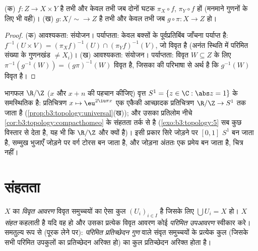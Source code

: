 \begin{proposition}[सार्वत्रिक गुण]
\label{prop:b3:topology:universal}
(क) $f \colon Z \to X \times Y$  है तभी और केवल तभी जब दोनों घटक $\pi_X \circ f$, $\pi_Y \circ f$ 
हों (मनमाने गुणनों के लिए भी वही)।
(ख) $g \colon X/{\sim} \to Z$  है तभी और केवल तभी जब $g \circ \pi
\colon X \to Z$  हो।
\end{proposition}

\begin{proof}
(क) आवश्यकता: संयोजन। पर्याप्तता: केवल  बक्सों के
पूर्वप्रतिबिंब जाँचना पर्याप्त है: $f^{-1}(U \times V) = (\pi_Xf)^{-1}(U)
\cap (\pi_Yf)^{-1}(V)$, जो विवृत है (अनंत
स्थिति में परिमित संख्या के गुणनखंड $\neq X_i$)। (ख) आवश्यकता:
संयोजन। पर्याप्तता: विवृत $W \subseteq Z$ के लिए $\pi^{-1}(g^{-1}(W)) = (g\pi)^{-1}(W)$ विवृत है, जिसका
 की परिभाषा से अर्थ है कि $g^{-1}(W)$ विवृत है।
\end{proof}

\begin{example}\label{ex:b3:topology:circle}
भागफल $\R/\Z$ ($x$ और $x + n$ की पहचान कीजिए) वृत्त $S^1 = \{z \in \C : \abs z = 1\}$ के
समस्थितिक है: प्रतिचित्रण $x
\mapsto \eu^{2\iu\pi x}$ एक  एकैकी आच्छादक प्रतिचित्रण
$\R/\Z \to S^1$ तक जाता है (\cref{prop:b3:topology:universal}(ख)); और उसका प्रतिलोम नीचे \cref{cor:b3:topology:compacthomeo} के
संहतता तर्क से  है (\cref{exo:b3:topology:5} सब कुछ विस्तार से देता है, यह भी कि
$\R/\Z$  और  क्यों है)। इसी प्रकार सिरे जोड़ने पर
$[0,1]$ $S^1$ बन जाता है, सम्मुख भुजाएँ जोड़ने पर वर्ग टोरस बन जाता
है, और जोड़ना अंततः एक प्रमेय बन जाता है, चित्र नहीं।
\end{example}

\section{संहतता}

\begin{definition}\label{def:b3:topology:compact}
$X$ का \emph{विवृत आवरण} विवृत समुच्चयों का ऐसा कुल $(U_i)_{i\in I}$ है
जिसके लिए $\bigcup U_i = X$ हो। $X$ \emph{संहत} कहलाती
है यदि वह  हो और उसका प्रत्येक विवृत आवरण कोई
\emph{परिमित उपआवरण} स्वीकार करे। समतुल्य रूप से (पूरक लेने पर):
\emph{परिमित प्रतिच्छेदन गुण} वाले संवृत समुच्चयों के प्रत्येक
कुल (जिसके सभी परिमित उपकुलों का प्रतिच्छेदन अरिक्त हो) का कुल
प्रतिच्छेदन अरिक्त होता है।
\end{definition}

